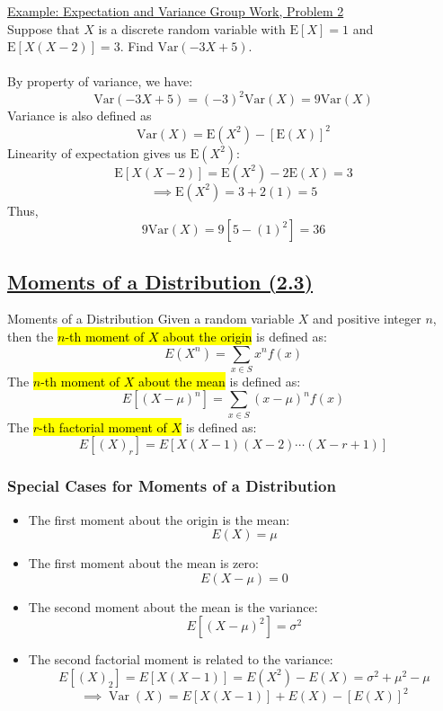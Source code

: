 ﻿\documentclass[12pt]{article}
\begin{document}
\newpage
\underline{Example: Expectation and Variance Group Work, Problem 2}\\
Suppose that $X$ is a discrete random variable with $\mathrm{E}[X]=1$ and $\mathrm{E}[X(X-2)]=3$. Find $\mathrm{Var}(-3X+5)$.\\\\
By property of variance, we have:
\[\mathrm{Var}(-3X+5) = (-3)^2\mathrm{Var}(X) = 9\mathrm{Var}(X)\]
Variance is also defined as 
\[\mathrm{Var}(X) =\mathrm{E}(X^2) - [\mathrm{E}(X)]^2\]
Linearity of expectation gives us $\mathrm{E}(X^2)$:
\[\mathrm{E}[X(X-2)] = \mathrm{E}(X^2) - 2\mathrm{E}(X) = 3\]
\[\implies \mathrm{E}(X^2) = 3 + 2(1) = 5\]
Thus, 
\[9\mathrm{Var}(X) = 9[5-(1)^2] = \boxed{36}\]
\subsection*{\underline{Moments of a Distribution (2.3)}}
\begin{definition}{Moments of a Distribution}
    Given a random variable $X$ and positive integer $n$, then the \hl{$n$-th moment of $X$ about the origin} is defined as:
    \[E(X^n) = \sum_{x \in S} x^n f(x)\]
    The \hl{$n$-th moment of $X$ about the mean} is defined as:
    \[E[(X-\mu)^n] = \sum_{x \in S} (x-\mu)^n f(x)\]
    The \hl{$r$-th factorial moment of $X$} is defined as:
    \[E[(X)_r] = E[X(X-1)(X-2)\cdots(X-r+1)]\]
\end{definition}
\subsubsection*{Special Cases for Moments of a Distribution}
\begin{itemize}
    \item The first moment about the origin is the mean: \[E(X)=\mu\]
    \item The first moment about the mean is zero: \[E(X-\mu)=0\]
    \item The second moment about the mean is the variance: \[E[(X-\mu)^2]=\sigma^2\]
    \item The second factorial moment is related to the variance: \[E[(X)_2]=E[X(X-1)]=E(X^2)-E(X)=\sigma^2+\mu^2-\mu\]
    \[\boxed{\implies \operatorname{Var}(X) = E[X(X-1)] + E(X) - [E(X)]^2}\] 
\end{itemize}
\end{document}
